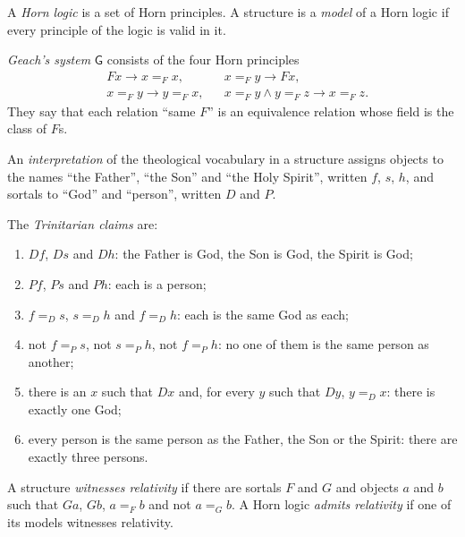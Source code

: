 \documentclass{situationist-preprint}
\begin{document}
\begin{definition}\label{d:logic}
A \emph{Horn logic} is a set of Horn principles. A structure is a \emph{model} of a Horn logic if every principle of the logic is valid in it.
\end{definition}

\begin{definition}\label{d:geach}
\emph{Geach's system} $\mathsf{G}$ consists of the four Horn principles
\begin{align*}
&F x \to x =_F x, && x =_F y \to F x,\\
&x =_F y \to y =_F x, && x =_F y \wedge y =_F z \to x =_F z.
\end{align*}
They say that each relation \enquote{same $F$} is an equivalence relation whose field is the class of $F$s.
\end{definition}

\begin{definition}\label{d:interp}
An \emph{interpretation} of the theological vocabulary in a structure assigns objects to the names \enquote{the Father}, \enquote{the Son} and \enquote{the Holy Spirit}, written $f$, $s$, $h$, and sortals to \enquote{God} and \enquote{person}, written $D$ and $P$.
\end{definition}

\begin{definition}\label{d:trin}
The \emph{Trinitarian claims} are:
\begin{enumerate}[label=(T\arabic*)]
\item $D f$, $D s$ and $D h$: the Father is God, the Son is God, the Spirit is God;
\item $P f$, $P s$ and $P h$: each is a person;
\item $f =_D s$, $s =_D h$ and $f =_D h$: each is the same God as each;
\item not $f =_P s$, not $s =_P h$, not $f =_P h$: no one of them is the same person as another;
\item there is an $x$ such that $D x$ and, for every $y$ such that $D y$, $y =_D x$: there is exactly one God;
\item every person is the same person as the Father, the Son or the Spirit: there are exactly three persons.
\end{enumerate}
\end{definition}

\begin{definition}\label{d:relativity}
A structure \emph{witnesses relativity} if there are sortals $F$ and $G$ and objects $a$ and $b$ such that $G a$, $G b$, $a =_F b$ and not $a =_G b$. A Horn logic \emph{admits relativity} if one of its models witnesses relativity.
\end{definition}
\end{document}
